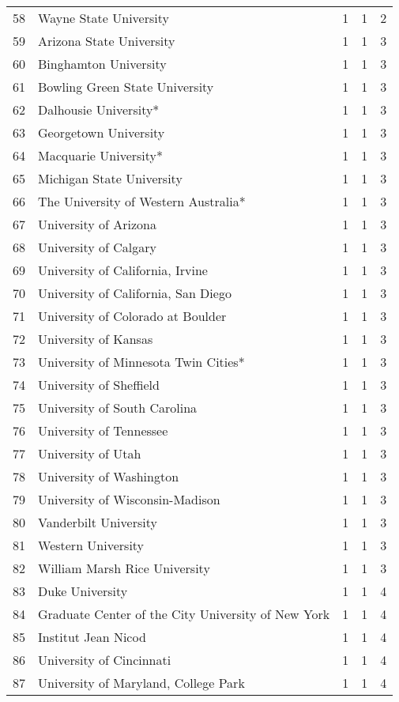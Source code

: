 \begin{longtable}{rllll}
  58 & Wayne State University & 1 & 1 & 2 \\ 
  59 & Arizona State University & 1 & 1 & 3 \\ 
  60 & Binghamton University & 1 & 1 & 3 \\ 
  61 & Bowling Green State University & 1 & 1 & 3 \\ 
  62 & Dalhousie University* & 1 & 1 & 3 \\ 
  63 & Georgetown University & 1 & 1 & 3 \\ 
  64 & Macquarie University* & 1 & 1 & 3 \\ 
  65 & Michigan State University & 1 & 1 & 3 \\ 
  66 & The University of Western Australia* & 1 & 1 & 3 \\ 
  67 & University of Arizona & 1 & 1 & 3 \\ 
  68 & University of Calgary & 1 & 1 & 3 \\ 
  69 & University of California, Irvine & 1 & 1 & 3 \\ 
  70 & University of California, San Diego & 1 & 1 & 3 \\ 
  71 & University of Colorado at Boulder & 1 & 1 & 3 \\ 
  72 & University of Kansas & 1 & 1 & 3 \\ 
  73 & University of Minnesota Twin Cities* & 1 & 1 & 3 \\ 
  74 & University of Sheffield & 1 & 1 & 3 \\ 
  75 & University of South Carolina & 1 & 1 & 3 \\ 
  76 & University of Tennessee & 1 & 1 & 3 \\ 
  77 & University of Utah & 1 & 1 & 3 \\ 
  78 & University of Washington & 1 & 1 & 3 \\ 
  79 & University of Wisconsin-Madison & 1 & 1 & 3 \\ 
  80 & Vanderbilt University & 1 & 1 & 3 \\ 
  81 & Western University & 1 & 1 & 3 \\ 
  82 & William Marsh Rice University & 1 & 1 & 3 \\ 
  83 & Duke University & 1 & 1 & 4 \\ 
  84 & Graduate Center of the City University of New York & 1 & 1 & 4 \\ 
  85 & Institut Jean Nicod & 1 & 1 & 4 \\ 
  86 & University of Cincinnati & 1 & 1 & 4 \\ 
  87 & University of Maryland, College Park & 1 & 1 & 4 \\ 

\end{longtable}
